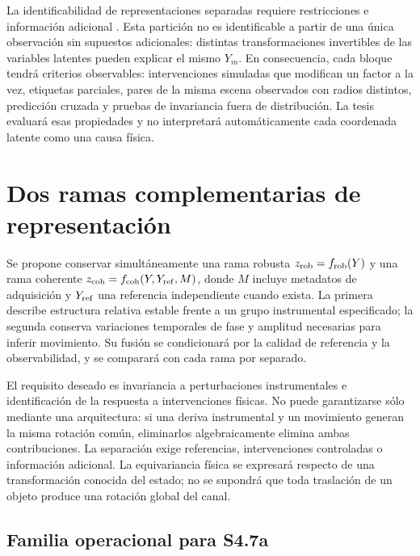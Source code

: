 La identificabilidad de representaciones separadas requiere restricciones e
información adicional \citep{Locatello2019Identifiability}. Esta partición no es identificable
a partir de una única observación sin supuestos adicionales: distintas transformaciones invertibles de las variables latentes pueden explicar el mismo $Y_m$. En consecuencia, cada bloque tendrá criterios observables: intervenciones simuladas que modifican un factor a la vez, etiquetas parciales, pares de la misma escena observados con radios distintos, predicción cruzada y pruebas de invariancia fuera de distribución. La tesis evaluará esas propiedades y no interpretará automáticamente cada coordenada latente como una causa física.

\section{Dos ramas complementarias de representación}
\label{sec:two_representation_branches}

Se propone conservar simultáneamente una rama robusta $z_{\rm rob}=f_{\rm rob}(Y)$
y una rama coherente $z_{\rm coh}=f_{\rm coh}(Y,Y_{\rm ref},M)$, donde $M$ incluye
metadatos de adquisición y $Y_{\rm ref}$ una referencia independiente cuando exista.
La primera describe estructura relativa estable frente a un grupo instrumental
especificado; la segunda conserva variaciones temporales de fase y amplitud necesarias
para inferir movimiento. Su fusión se condicionará por la calidad de referencia y
la observabilidad, y se comparará con cada rama por separado.

El requisito deseado es invariancia a perturbaciones instrumentales e identificación
de la respuesta a intervenciones físicas. No puede garantizarse sólo mediante una
arquitectura: si una deriva instrumental y un movimiento generan la misma rotación
común, eliminarlos algebraicamente elimina ambas contribuciones. La separación exige
referencias, intervenciones controladas o información adicional. La equivariancia
física se expresará respecto de una transformación conocida del estado; no se
supondrá que toda traslación de un objeto produce una rotación global del canal.

\subsection{Familia operacional para S4.7a}
\label{sec:representation_v_family}

